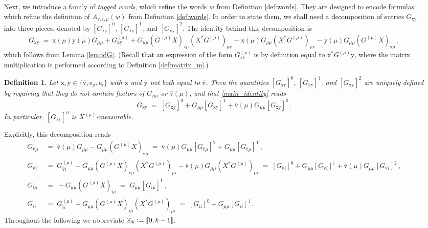 \documentclass[11pt]{article} %
\newcommand{\nc}{\normalcolor}
\numberwithin{equation}{section}
\numberwithin{figure}{section}
\theoremstyle{plain} %
\newtheorem{definition}[theorem]{Definition}
\theoremstyle{definition} %
\newcommand{\f}[1]{\boldsymbol{\mathrm{#1}}} %
\newcommand{\Z}{\mathbb{Z}}
\newcommand*{\deq}{\mathrel{\vcenter{\baselineskip0.65ex \lineskiplimit0pt \hbox{.}\hbox{.}}}=}
\newcommand{\qq}[1]{[\![{#1}]\!]}
\begin{document}
Next, we introduce a family of \emph{tagged words}, which refine the words $w$ from Definition \ref{def:words}. They are designed to encode formulas which refine the definition of $A_{\f v,i,\mu}(w)$ from Definition \ref{def:words}. In order to state them, we shall need a decomposition of entries $G_{\f x \f y}$ into three pieces, denoted by $[G_{\f x \f y}]^0$, $[G_{\f x \f y}]^1$, and $[G_{\f x \f y}]^2$. The identity behind this decomposition is
\begin{equation}  \label{main_identity}
G_{\f x \f y} \;=\; \f x(\mu) \f y(\mu) G_{\mu \mu} + G_{\f x\f y}^{(\mu)} + G_{\mu \mu} (G^{(\mu)} X)_{\f x \mu} (X^* G^{(\mu)})_{\mu \f y} - \f x(\mu) G_{\mu \mu} (X^* G^{(\mu)})_{\mu \f y} - \f y(\mu) G_{\mu \mu} (G^{(\mu)} X)_{\f x \mu}\,,
\end{equation}
which follows from Lemma \ref{lem:idG}.
(Recall that an expression of the form $G_{\f x \f y}^{(\mu)}$ is by definition equal to $\f x^* G^{(\mu)} \f y$, where the matrix multiplication is performed according to Definition \ref{def:matrix_m}.)


\begin{definition} \label{def:G_brack}
Let $\f x, \f y \in \{\bar {\f v}, \f e_\mu, \f e_i\}$ with $\f x$ and $\f y$ not both equal to $\bar {\f v}$. Then the quantities $[G_{\f x \f y}]^0$, $[G_{\f x \f y}]^1$, and $[G_{\f x \f y}]^2$ are uniquely defined by requiring that they do not contain factors of $G_{\mu \mu}$ or $\bar {\f v}(\mu)$, and that \eqref{main_identity} reads
\begin{equation} \label{G_split}
G_{\f x \f y} \;=\; [G_{\f x\f y}]^0 + G_{\mu \mu} [G_{\f x \f y}]^1  + \bar {\f v}(\mu) G_{\mu \mu} [G_{\f x \f y}]^2\,.
\end{equation}
In particular, $[G_{\f x\f y}]^0$ is $X^{(\mu)}$-measurable.
\end{definition}
Explicitly, this decomposition reads
\begin{align*}
G_{\bar {\f v} \mu} &\;=\; \bar{\f v}(\mu) G_{\mu \mu} - G_{\mu \mu} (G^{(\mu)} X)_{\bar{\f v} \mu}
\;=\; \bar {\f v}(\mu) G_{\mu \mu} [G_{\bar {\f v} \mu}]^2 + G_{\mu \mu} [G_{\bar {\f v} \mu}]^1\,,
\\
G_{\bar {\f v} i} &\;=\; G_{\bar {\f v} i}^{(\mu)} + G_{\mu \mu} (G^{(\mu)} X)_{\bar {\f v} \mu} (X^* G^{(\mu)})_{\mu i} - \bar {\f v}(\mu) G_{\mu \mu} (X^* G^{(\mu)})_{\mu i} \;=\; [G_{\bar {\f v} i}]^0 + G_{\mu \mu} [G_{\bar {\f v} i}]^1  + \bar {\f v}(\mu) G_{\mu \mu} [G_{\bar {\f v} i}]^2\,,
\\
G_{i \mu} &\;=\; - G_{\mu \mu} (G^{(\mu)} X)_{i \mu} \;=\; G_{\mu \mu} [G_{i \mu}]^1\,,
\\
G_{i i} &\;=\; G_{ii}^{(\mu)} + G_{\mu \mu} (G^{(\mu)} X)_{i \mu} (X^* G^{(\mu)})_{\mu i} \;=\; [G_{ii}]^0 + G_{\mu \mu} [G_{ii}]^1\,.
\end{align*} 
Throughout the following we abbreviate $\Z_k \deq \qq{0,k-1}$. \nc
\end{document}

